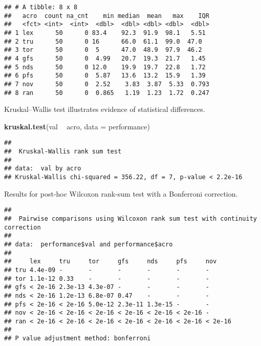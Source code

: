 \documentclass[]{book}
\newenvironment{Shaded}{\begin{snugshade}}{\end{snugshade}}
\newcommand{\DataTypeTok}[1]{\textcolor[rgb]{0.13,0.29,0.53}{#1}}
\newcommand{\KeywordTok}[1]{\textcolor[rgb]{0.13,0.29,0.53}{\textbf{#1}}}
\newcommand{\NormalTok}[1]{#1}
\newcommand{\OperatorTok}[1]{\textcolor[rgb]{0.81,0.36,0.00}{\textbf{#1}}}
\newcommand{\OtherTok}[1]{\textcolor[rgb]{0.56,0.35,0.01}{#1}}
\newcommand{\StringTok}[1]{\textcolor[rgb]{0.31,0.60,0.02}{#1}}
\begin{document}
\begin{verbatim}
## # A tibble: 8 x 8
##   acro  count na_cnt    min median  mean   max    IQR
##   <fct> <int>  <int>  <dbl>  <dbl> <dbl> <dbl>  <dbl>
## 1 lex      50      0 83.4    92.3  91.9  98.1   5.51 
## 2 tru      50      0 16      66.0  61.1  99.0  47.0  
## 3 tor      50      0  5      47.0  48.9  97.9  46.2  
## 4 gfs      50      0  4.99   20.7  19.3  21.7   1.45 
## 5 nds      50      0 12.0    19.9  19.7  22.8   1.72 
## 6 pfs      50      0  5.87   13.6  13.2  15.9   1.39 
## 7 nov      50      0  2.52    3.83  3.87  5.33  0.793
## 8 ran      50      0  0.865   1.19  1.23  1.72  0.247
\end{verbatim}

Kruskal--Wallis test illustrates evidence of statistical differences.

\begin{Shaded}
\begin{Highlighting}[]
\KeywordTok{kruskal.test}\NormalTok{(val }\OperatorTok{~}\StringTok{ }\NormalTok{acro, }\DataTypeTok{data =}\NormalTok{ performance)}
\end{Highlighting}
\end{Shaded}

\begin{verbatim}
## 
##  Kruskal-Wallis rank sum test
## 
## data:  val by acro
## Kruskal-Wallis chi-squared = 356.22, df = 7, p-value < 2.2e-16
\end{verbatim}

Results for post-hoc Wilcoxon rank-sum test with a Bonferroni correction.

\begin{Shaded}
\end{Shaded}

\begin{verbatim}
## 
##  Pairwise comparisons using Wilcoxon rank sum test with continuity correction 
## 
## data:  performance$val and performance$acro 
## 
##     lex     tru     tor     gfs     nds     pfs     nov    
## tru 4.4e-09 -       -       -       -       -       -      
## tor 1.1e-12 0.33    -       -       -       -       -      
## gfs < 2e-16 2.3e-13 4.3e-07 -       -       -       -      
## nds < 2e-16 1.2e-13 6.8e-07 0.47    -       -       -      
## pfs < 2e-16 < 2e-16 5.0e-12 2.3e-11 1.3e-15 -       -      
## nov < 2e-16 < 2e-16 < 2e-16 < 2e-16 < 2e-16 < 2e-16 -      
## ran < 2e-16 < 2e-16 < 2e-16 < 2e-16 < 2e-16 < 2e-16 < 2e-16
## 
## P value adjustment method: bonferroni
\end{verbatim}
\end{document}
